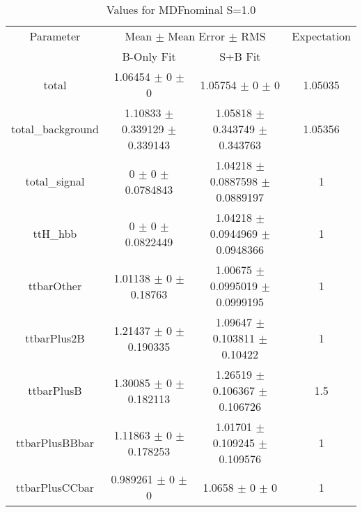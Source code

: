 \begin{table}
\centering
\caption{Values for MDFnominal S=1.0}
\begin{tabular}{cccc}
\toprule
Parameter & \multicolumn{2}{c}{Mean $\pm$ Mean Error $\pm$ RMS} & Expectation\\
 & B-Only Fit & S+B Fit & \\
\midrule
total & \num{1.06454} $\pm$ \num{0} $\pm$ \num{0} & \num{1.05754} $\pm$ \num{0} $\pm$ \num{0} & \num{1.05035}\\
total\_background & \num{1.10833} $\pm$ \num{0.339129} $\pm$ \num{0.339143} & \num{1.05818} $\pm$ \num{0.343749} $\pm$ \num{0.343763} & \num{1.05356}\\
total\_signal & \num{0} $\pm$ \num{0} $\pm$ \num{0.0784843} & \num{1.04218} $\pm$ \num{0.0887598} $\pm$ \num{0.0889197} & \num{1}\\
ttH\_hbb & \num{0} $\pm$ \num{0} $\pm$ \num{0.0822449} & \num{1.04218} $\pm$ \num{0.0944969} $\pm$ \num{0.0948366} & \num{1}\\
ttbarOther & \num{1.01138} $\pm$ \num{0} $\pm$ \num{0.18763} & \num{1.00675} $\pm$ \num{0.0995019} $\pm$ \num{0.0999195} & \num{1}\\
ttbarPlus2B & \num{1.21437} $\pm$ \num{0} $\pm$ \num{0.190335} & \num{1.09647} $\pm$ \num{0.103811} $\pm$ \num{0.10422} & \num{1}\\
ttbarPlusB & \num{1.30085} $\pm$ \num{0} $\pm$ \num{0.182113} & \num{1.26519} $\pm$ \num{0.106367} $\pm$ \num{0.106726} & \num{1.5}\\
ttbarPlusBBbar & \num{1.11863} $\pm$ \num{0} $\pm$ \num{0.178253} & \num{1.01701} $\pm$ \num{0.109245} $\pm$ \num{0.109576} & \num{1}\\
ttbarPlusCCbar & \num{0.989261} $\pm$ \num{0} $\pm$ \num{0} & \num{1.0658} $\pm$ \num{0} $\pm$ \num{0} & \num{1}\\
\bottomrule
\end{tabular}
\end{table}